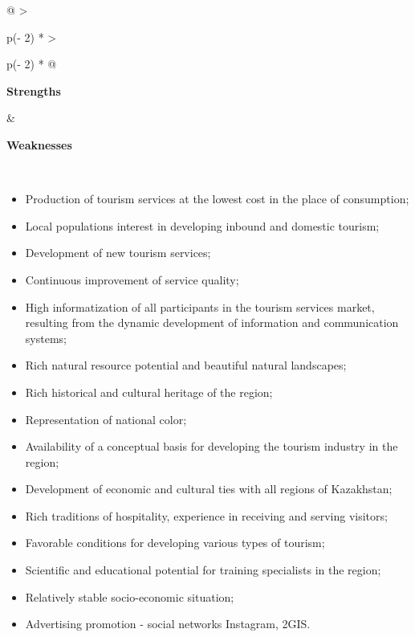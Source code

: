 \begin{longtable}[]{@{}
  >{\raggedright\arraybackslash}p{(\columnwidth - 2\tabcolsep) * }
  >{\raggedright\arraybackslash}p{(\columnwidth - 2\tabcolsep) * }@{}}
\toprule\noalign{}
\begin{minipage}[b]{\linewidth}\raggedright
{\bfseries Strengths}
\end{minipage} & \begin{minipage}[b]{\linewidth}\raggedright
{\bfseries Weaknesses}
\end{minipage} \\
\midrule\noalign{}
\endhead
\bottomrule\noalign{}
\endlastfoot
\begin{minipage}[t]{\linewidth}\raggedright
\begin{itemize}
\item
  Production of tourism services at the lowest cost in the place of
  consumption;
\item
  Local population\textquotesingle s interest in developing inbound and
  domestic tourism;
\item
  Development of new tourism services;
\item
  Continuous improvement of service quality;
\item
  High informatization of all participants in the tourism services
  market, resulting from the dynamic development of information and
  communication systems;
\item
  Rich natural resource potential and beautiful natural landscapes;
\item
  Rich historical and cultural heritage of the region;
\item
  Representation of national color;
\item
  Availability of a conceptual basis for developing the tourism industry
  in the region;
\item
  Development of economic and cultural ties with all regions of
  Kazakhstan;
\item
  Rich traditions of hospitality, experience in receiving and serving
  visitors;
\item
  Favorable conditions for developing various types of tourism;
\item
  Scientific and educational potential for training specialists in the
  region;
\item
  Relatively stable socio-economic situation;
\item
  Advertising promotion - social networks Instagram, 2GIS.
\end{itemize}

\end{minipage}
\end{longtable}
